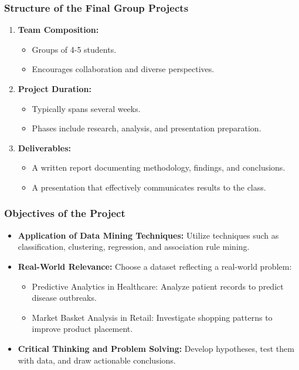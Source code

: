 \documentclass{beamer}
\begin{document}
\begin{frame}[fragile]
    \frametitle{Structure of the Final Group Projects}
    \begin{enumerate}
        \item \textbf{Team Composition:}
        \begin{itemize}
            \item Groups of 4-5 students.
            \item Encourages collaboration and diverse perspectives.
        \end{itemize}

        \item \textbf{Project Duration:}
        \begin{itemize}
            \item Typically spans several weeks.
            \item Phases include research, analysis, and presentation preparation.
        \end{itemize}

        \item \textbf{Deliverables:}
        \begin{itemize}
            \item A written report documenting methodology, findings, and conclusions.
            \item A presentation that effectively communicates results to the class.
        \end{itemize}
    \end{enumerate}
\end{frame}

\begin{frame}[fragile]
    \frametitle{Objectives of the Project}
    \begin{itemize}
        \item \textbf{Application of Data Mining Techniques:} Utilize techniques such as classification, clustering, regression, and association rule mining.
        
        \item \textbf{Real-World Relevance:} Choose a dataset reflecting a real-world problem:
        \begin{itemize}
            \item Predictive Analytics in Healthcare: Analyze patient records to predict disease outbreaks.
            \item Market Basket Analysis in Retail: Investigate shopping patterns to improve product placement.
        \end{itemize}
        
        \item \textbf{Critical Thinking and Problem Solving:} Develop hypotheses, test them with data, and draw actionable conclusions.
    \end{itemize}
\end{frame}
\end{document}
